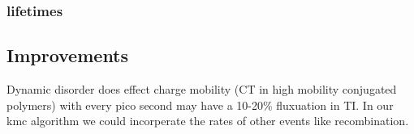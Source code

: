 \subsubsection{lifetimes}

\subsection{Improvements}
Dynamic disorder does effect charge mobility (CT in high mobility conjugated polymers) with every pico second
may have a 10-20\% fluxuation in TI. 
In our kmc algorithm we could incorperate the rates of other events like recombination.
